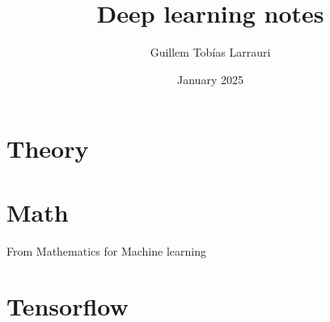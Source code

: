 \documentclass{article}
\title{Deep learning notes}
\author{Guillem Tobías Larrauri}
\date{January 2025}
\begin{document}
\maketitle

\section{Theory}


\section{Math}
From Mathematics for Machine learning

\section{Tensorflow}
\end{document}
